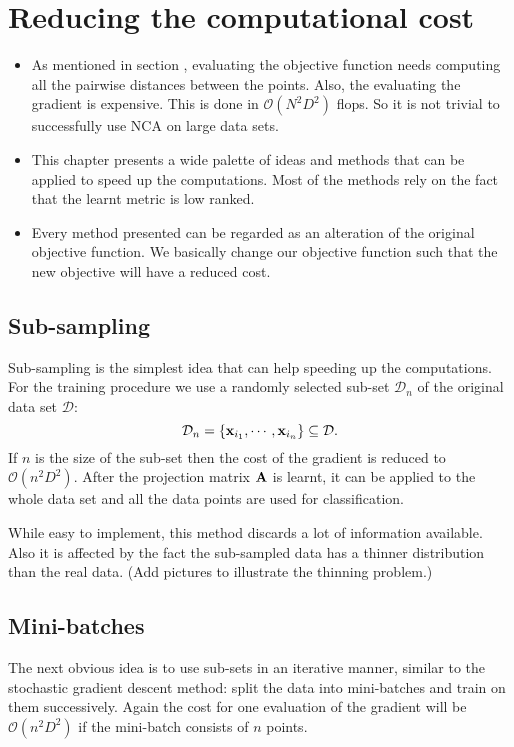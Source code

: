 \chapter{Reducing the computational cost}
\label{ch:reducing}

\begin{itemize}
	\item As mentioned in section , evaluating the objective function needs computing all the pairwise distances between the points. Also, the evaluating the gradient is expensive. This is done in $\mathcal{O}(N^2D^2)$ flops. So it is not trivial to successfully use NCA on large data sets.
	\item This chapter presents a wide palette of ideas and methods that can be applied to speed up the computations. Most of the methods rely on the fact that the learnt metric is low ranked.
	\item Every method presented can be regarded as an alteration of the original objective function. We basically change our objective function such that the new objective will have a reduced cost.
\end{itemize}

\section{Sub-sampling}
\label{sec:sub-sampling}

Sub-sampling is the simplest idea that can help speeding up the computations. For the training procedure we use a randomly selected sub-set $\mathcal{D}_n$ of the original data set $\mathcal{D}$:
 \[
 	\mathcal{D}_n = \{ \mathbf{x}_{i_1},\cdots,\mathbf{x}_{i_n} \} \subseteq \mathcal{D}.
 \]
 If $n$ is the size of the sub-set then the cost of the gradient is reduced to $\mathcal{O}(n^2D^2)$. After the projection matrix $\mathbf{A}$ is learnt, it can be applied to the whole data set and all the data points are used for classification.

While easy to implement, this method discards a lot of information available. Also it is affected by the fact the sub-sampled data has a thinner distribution than the real data. (Add pictures to illustrate the thinning problem.)

\section{Mini-batches}
\label{sec:mini-batches}

The next obvious idea is to use sub-sets in an iterative manner, similar to the stochastic gradient descent method: split the data into mini-batches and train on them successively. Again the cost for one evaluation of the gradient will be $\mathcal{O}(n^2D^2)$ if the mini-batch consists of $n$ points.

